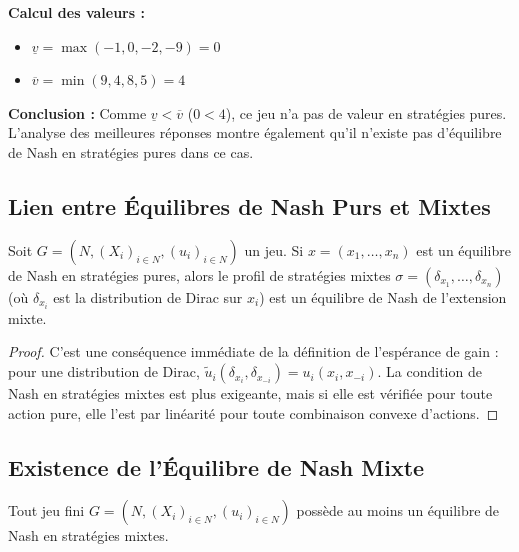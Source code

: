 \textbf{Calcul des valeurs :}
\begin{itemize}
    \item $\underline{v} = \max(-1, 0, -2, -9) = 0$
    \item $\overline{v} = \min(9, 4, 8, 5) = 4$
\end{itemize}

\textbf{Conclusion :}
Comme $\underline{v} < \overline{v}$ ($0 < 4$), ce jeu n'a pas de valeur en stratégies pures. L'analyse des meilleures réponses montre également qu'il n'existe pas d'équilibre de Nash en stratégies pures dans ce cas.


\subsection{Lien entre Équilibres de Nash Purs et Mixtes}

\begin{proposition}
Soit $G = (N, (X_i)_{i \in N}, (u_i)_{i \in N})$ un jeu. Si $x = (x_1, \dots, x_n)$ est un équilibre de Nash en stratégies pures, alors le profil de stratégies mixtes $\sigma = (\delta_{x_1}, \dots, \delta_{x_n})$ (où $\delta_{x_i}$ est la distribution de Dirac sur $x_i$) est un équilibre de Nash de l'extension mixte.
\end{proposition}

\begin{proof}
C'est une conséquence immédiate de la définition de l'espérance de gain : pour une distribution de Dirac, $\tilde{u}_i(\delta_{x_i}, \delta_{x_{-i}}) = u_i(x_i, x_{-i})$. La condition de Nash en stratégies mixtes est plus exigeante, mais si elle est vérifiée pour toute action pure, elle l'est par linéarité pour toute combinaison convexe d'actions.
\end{proof}

\subsection{Existence de l'Équilibre de Nash Mixte}

\begin{theorem}
Tout jeu fini $G = (N, (X_i)_{i \in N}, (u_i)_{i \in N})$ possède au moins un équilibre de Nash en stratégies mixtes.
\end{theorem}

